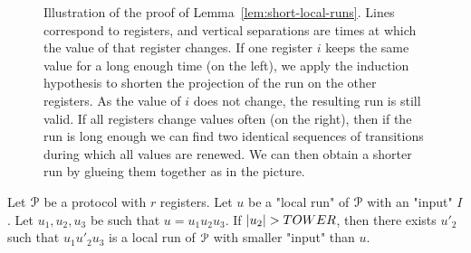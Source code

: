 \begin{figure}
	
	\caption{Illustration of the proof of Lemma~\ref{lem:short-local-runs}. Lines correspond to registers, and vertical separations are times at which the value of that register changes. If one register $i$ keeps the same value for a long enough time (on the left), we apply the induction hypothesis to shorten the projection of the run on the other registers. As the value of $i$ does not change, the resulting run is still valid. If all registers change values often (on the right), then if the run is long enough we can find two identical sequences of transitions during which all values are renewed. We can then obtain a shorter run by glueing them together as in the picture.}
\end{figure}




\begin{lemma}
	\label{lem:short-local-runs}
	Let $\mathcal{P}$ be a protocol with $r$ registers.
	Let $u$ be a "local run" of $\mathcal{P}$ with an "input" $I$.
	Let $u_1, u_2, u_3$ be such that $u=u_1u_2u_3$.
	If $|u_2| > TOWER$, then there exists $u'_2$ such that $u_1u'_2u_3$ is a local run of $\mathcal{P}$ with smaller "input" than $u$. 
\end{lemma}

